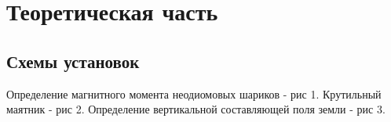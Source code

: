 

\newcommand{\formula}[3]
{
    \noindent#1\\[0.1cm]
    \begin{equation}\label{#2}
        #3
    \end{equation}
}

\newcommand{\mth}[1]
{
    \begin{math}
        #1
    \end{math}
}

\newcommand{\ruB}[1]
{
    _{\text{#1}}
}


\section{Теоретическая часть}

\subsection{Схемы установок}
Определение магнитного момента неодиомовых шариков - рис 1. Крутильный маятник - рис 2. Определение вертикальной составляющей поля земли - рис 3.

